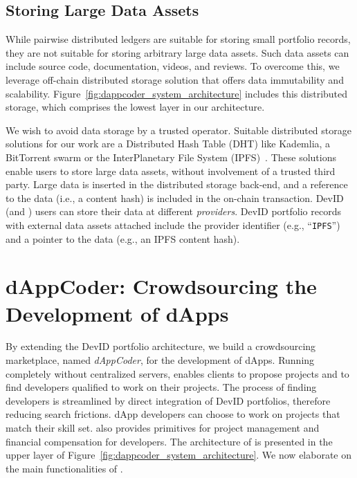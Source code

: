 \subsection{Storing Large Data Assets}
While pairwise distributed ledgers are suitable for storing small portfolio records, they are not suitable for storing arbitrary large data assets.
Such data assets can include source code, documentation, videos, and reviews.
To overcome this, we leverage off-chain distributed storage solution that offers data immutability and scalability.
Figure~\ref{fig:dappcoder_system_architecture} includes this distributed storage, which comprises the lowest layer in our architecture.

We wish to avoid data storage by a trusted operator.
Suitable distributed storage solutions for our work are a Distributed Hash Table (DHT) like Kademlia, a BitTorrent swarm or the InterPlanetary File System (IPFS)~\cite{maymounkov2002kademlia,cohen2008bittorrent,benet2014ipfs}.
These solutions enable users to store large data assets, without involvement of a trusted third party.
Large data is inserted in the distributed storage back-end, and a reference to the data (i.e., a content hash) is included in the on-chain transaction.
DevID (and \Dappcoder{}) users can store their data at different \emph{providers}.
DevID portfolio records with external data assets attached include the provider identifier (e.g., \enquote{\texttt{IPFS}}) and a pointer to the data (e.g., an IPFS content hash).

\section{dAppCoder: Crowdsourcing the Development of dApps}
\label{sec:dappcoder}
By extending the DevID portfolio architecture, we build a crowdsourcing marketplace, named \emph{dAppCoder}, for the development of dApps.
Running completely without centralized servers, \Dappcoder{} enables clients to propose projects and to find developers qualified to work on their projects.
The process of finding developers is streamlined by direct integration of DevID portfolios, therefore reducing search frictions.
dApp developers can choose to work on projects that match their skill set.
\Dappcoder{} also provides primitives for project management and financial compensation for developers.
The architecture of \Dappcoder{} is presented in the upper layer of Figure~\ref{fig:dappcoder_system_architecture}.
We now elaborate on the main functionalities of \Dappcoder{}.


